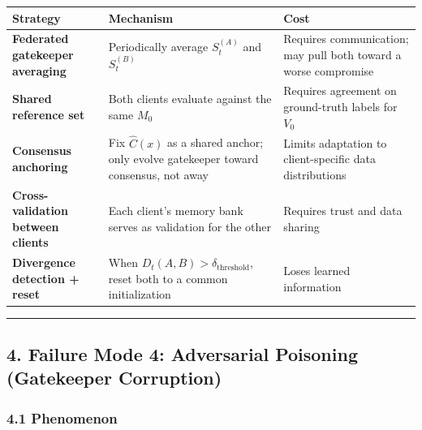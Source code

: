 \documentclass[
  12pt,
]{article}
\begin{document}
\begin{longtable}[]{@{}
  >{\raggedright\arraybackslash}p{}
  >{\raggedright\arraybackslash}p{}
  >{\raggedright\arraybackslash}p{}@{}}
\toprule\noalign{}
\begin{minipage}[b]{\linewidth}\raggedright
Strategy
\end{minipage} & \begin{minipage}[b]{\linewidth}\raggedright
Mechanism
\end{minipage} & \begin{minipage}[b]{\linewidth}\raggedright
Cost
\end{minipage} \\
\midrule\noalign{}
\endhead
\bottomrule\noalign{}
\endlastfoot
\textbf{Federated gatekeeper averaging} & Periodically average
\(S_t^{(A)}\) and \(S_t^{(B)}\) & Requires communication; may pull both
toward a worse compromise \\
\textbf{Shared reference set} & Both clients evaluate against the same
\(M_0\) & Requires agreement on ground-truth labels for \(V_0\) \\
\textbf{Consensus anchoring} & Fix \(\hat{C}(x)\) as a shared anchor;
only evolve gatekeeper toward consensus, not away & Limits adaptation to
client-specific data distributions \\
\textbf{Cross-validation between clients} & Each client's memory bank
serves as validation for the other & Requires trust and data sharing \\
\textbf{Divergence detection + reset} & When
\(D_t(A,B) > \delta_{\text{threshold}}\), reset both to a common
initialization & Loses learned information \\
\end{longtable}

\begin{center}\rule{0.5\linewidth}{0.5pt}\end{center}

\subsection{4. Failure Mode 4: Adversarial Poisoning (Gatekeeper
Corruption)}\label{failure-mode-4-adversarial-poisoning-gatekeeper-corruption}

\subsubsection{4.1 Phenomenon}\label{phenomenon-3}
\end{document}
